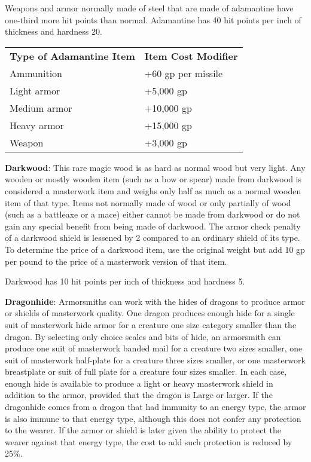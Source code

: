 Weapons and armor normally made of steel that are made of adamantine have one-third more hit points than normal. Adamantine has 40 hit points per inch of thickness and hardness 20.
			
\begin{table}
\sffamily
 \begin{tabular}{ll}
\textbf{Type of Adamantine Item} & \textbf{Item Cost Modifier}\\
Ammunition & +60 gp per missile \\
Light armor & +5,000 gp\\
Medium armor & +10,000 gp\\
Heavy armor & +15,000 gp\\
Weapon & +3,000 gp\\
 \end{tabular}

\end{table}

		
\textbf{Darkwood}: This rare magic wood is as hard as normal wood but very light. Any wooden or mostly wooden item (such as a bow or spear) made from darkwood is considered a masterwork item and weighs only half as much as a normal wooden item of that type. Items not normally made of wood or only partially of wood (such as a battleaxe or a mace) either cannot be made from darkwood or do not gain any special benefit from being made of darkwood. The armor check penalty of a darkwood shield is lessened by 2 compared to an ordinary shield of its type. To determine the price of a darkwood item, use the original weight but add 10 gp per pound to the price of a masterwork version of that item.
	
Darkwood has 10 hit points per inch of thickness and hardness 5.
	
\textbf{Dragonhide}: Armorsmiths can work with the hides of dragons to produce armor or shields of masterwork quality. One dragon produces enough hide for a single suit of masterwork hide armor for a creature one size category smaller than the dragon. By selecting only choice scales and bits of hide, an armorsmith can produce one suit of masterwork banded mail for a creature two sizes smaller, one suit of masterwork half-plate for a creature three sizes smaller, or one masterwork breastplate or suit of full plate for a creature four sizes smaller. In each case, enough hide is available to produce a light or heavy masterwork shield in addition to the armor, provided that the dragon is Large or larger. If the dragonhide comes from a dragon that had immunity to an energy type, the armor is also immune to that energy type, although this does not confer any protection to the wearer. If the armor or shield is later given the ability to protect the wearer against that energy type, the cost to add such protection is reduced by 25\%.
	
